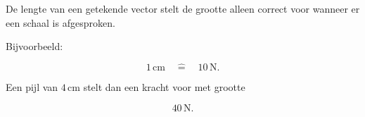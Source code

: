 \documentclass{ximera}
\begin{document}
\begin{opmerking}

De lengte van een getekende vector stelt de grootte alleen correct voor
wanneer er een schaal is afgesproken.

Bijvoorbeeld:

\[
1\,\si{\centi\meter}
\quad \widehat{=}\quad
10\,\si{\newton}.
\]

Een pijl van $4\,\si{\centi\meter}$ stelt dan een kracht voor met grootte

\[
40\,\si{\newton}.
\]

\end{opmerking}


\end{document}
